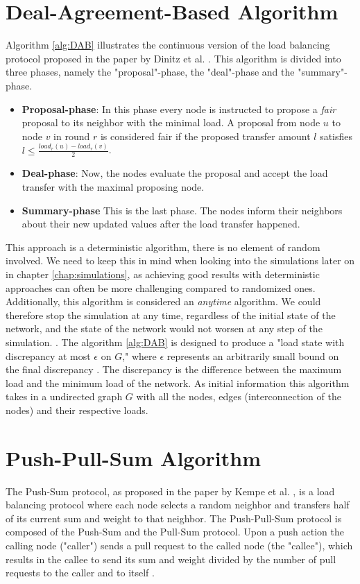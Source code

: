 

\section{Deal-Agreement-Based Algorithm}
Algorithm \ref{alg:DAB} illustrates the continuous version of the load balancing protocol proposed in the paper by Dinitz et al. \cite{dinitz2022localDealAgreementloadBalancing}. This algorithm is divided into three phases, namely the "proposal"-phase, the "deal"-phase and the "summary"-phase.
\begin{itemize}
    \item \textbf{Proposal-phase}: In this phase every node is instructed to propose a \textit{fair} proposal to its neighbor with the minimal load. A proposal from node $u$ to node $v$ in round $r$ is considered fair if the proposed transfer amount $l$ satisfies $l \leq \frac{load_{r}(u) - load_{r}(v)}{2}$.
    \item \textbf{Deal-phase}: Now, the nodes evaluate the proposal and accept the load transfer with the maximal proposing node.
    \item \textbf{Summary-phase} This is the last phase. The nodes inform their neighbors about their new updated values after the load transfer happened.
\end{itemize}
This approach is a deterministic algorithm, there is no element of random involved. We need to keep this in mind when looking into the simulations later on in chapter \ref{chap:simulations}, as achieving good results with deterministic approaches can often be more challenging compared to randomized ones. Additionally, this algorithm is considered an \textit{anytime} algorithm. We could therefore stop the simulation at any time, regardless of the initial state of the network, and the state of the network would not worsen at any step of the simulation. . The algorithm \ref{alg:DAB} is designed to produce a "load state with discrepancy at most $\epsilon$ on $G$," where $\epsilon$ represents an arbitrarily small bound on the final discrepancy \cite{dinitz2022localDealAgreementloadBalancing}. The discrepancy is the difference between the maximum load and the minimum load of the network. As initial information this algorithm takes in a undirected graph $G$ with all the nodes, edges (interconnection of the nodes) and their respective loads.

\section{Push-Pull-Sum Algorithm}
The Push-Sum protocol, as proposed in the paper by Kempe et al. \cite{kempe2003gossipbasedComp}, is a load balancing protocol where each node selects a random neighbor and transfers half of its current sum and weight to that neighbor. The Push-Pull-Sum protocol is composed of the Push-Sum and the Pull-Sum protocol. Upon a push action the calling node ("caller") sends a pull request to the called node (the "callee"), which results in the callee to send its sum and weight divided by the number of pull requests to the caller and to itself \cite{nugroho2023PushPullSumDataAg}.

